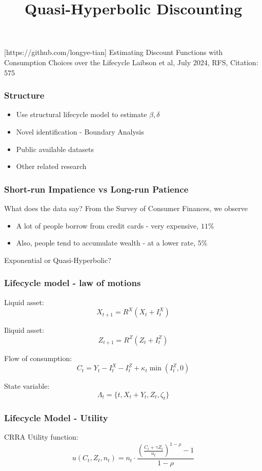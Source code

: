 \documentclass[11pt,xcolor={dvipsnames},hyperref={pdftex,pdfpagemode=UseNone,hidelinks,pdfdisplaydoctitle=true},usepdftitle=false]{beamer}
\begin{document}
\title{Quasi-Hyperbolic Discounting}

\information
%
[https://github.com/longye-tian]
%
{Estimating Discount Functions with Consumption Choices over the Lifecycle}
%
{Laibson et al, July 2024, RFS, Citation: 575}

\frame{\titlepage}

\begin{frame}
\frametitle{Structure}
\begin{itemize}

\item Use structural lifecycle model to estimate $\beta,\delta$
\item Novel identification - Boundary Analysis 
\item Public available datasets
\item Other related research

\end{itemize}
\end{frame}




\begin{frame}
\frametitle{Short-run Impatience vs Long-run Patience}
What does the data say? From the Survey of Consumer Finances, we observe
\begin{itemize}
\item A lot of people borrow from credit cards - very expensive, $11\%$
\item Also, people tend to accumulate wealth - at a lower rate, $5\%$
\end{itemize}
Exponential or Quasi-Hyperbolic?
\end{frame}


\begin{frame}
\frametitle{Lifecycle model - law of motions}
Liquid asset:
$$
X_{t+1} = R^X(X_t + I_t^X)
$$

Iliquid asset:
$$
Z_{t+1} = R^Z(Z_t + I_t^Z)
$$

Flow of consumption:
$$
C_t = Y_t - I_t^X - I_t^Z + \kappa_t \min(I_t^Z, 0)
$$

State variable:
$$
\Lambda_t  = \{t, X_t+Y_t, Z_t, \zeta_t\}
$$
\end{frame}


\begin{frame}
\frametitle{Lifecycle Model - Utility}

CRRA Utility function:
$$
u(C_t, Z_t, n_t) = n_t \cdot \frac{\left(\frac{C_t+\gamma Z_t}{n_t}\right)^{1-\rho}-1}{1-\rho}
$$
\end{frame}
\end{document}
